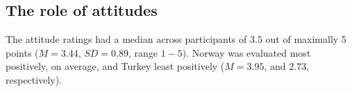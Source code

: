 \documentclass[a4paper,man, natbib,floatsintext]{apa6} %
\begin{document}
\subsection{The role of attitudes}
The attitude ratings had a median across participants of $3.5$ out of maximally 5 points ($M=3.44$, $SD=0.89$, range $1-5$). Norway was evaluated most positively, on average, and Turkey least positively ($M=3.95$, and $2.73$, respectively).








\end{document}
